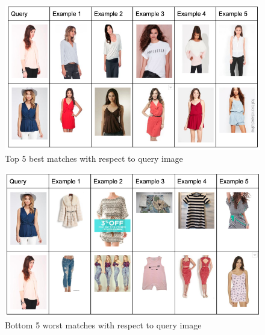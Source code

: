 \begin{figure}[tph!]
\centerline{\includegraphics[totalheight=6cm]{imgs/top_5.png}}
    \caption{Top 5 best matches with respect to query image}
    \label{fig:top5}
\end{figure}

\begin{figure}[tph!]
\centerline{\includegraphics[totalheight=6cm]{imgs/Bottom_5.png}}
    \caption{Bottom 5 worst matches with respect to query image}
    \label{fig:Bottom_5}
\end{figure}